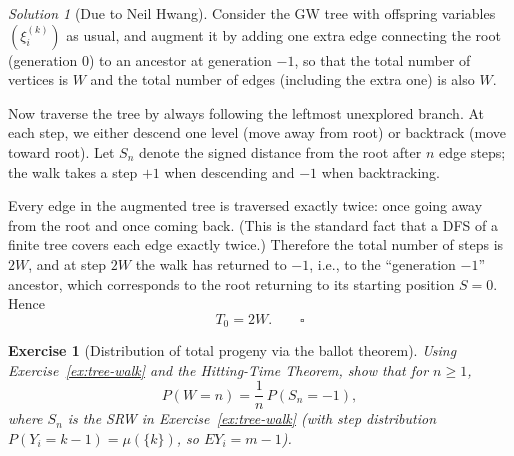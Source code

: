 \documentclass[12pt]{article}
\newtheorem{exercise}{Exercise}
\theoremstyle{remark}
\newtheorem*{solution}{Solution}
\begin{document}
\begin{solution}[Due to Neil Hwang]
Consider the GW tree with offspring variables $(\xi_i^{(k)})$ as usual, and augment it
by adding one extra edge connecting the root (generation $0$) to an ancestor at generation
$-1$, so that the total number of vertices is $W$ and the total number of edges
(including the extra one) is also $W$.

Now traverse the tree by always following the leftmost unexplored branch.  At each step,
we either descend one level (move away from root) or backtrack (move toward root).  Let
$S_n$ denote the signed distance from the root after $n$ edge steps; the walk takes a
step $+1$ when descending and $-1$ when backtracking.

Every edge in the augmented tree is traversed exactly twice: once going away from the root
and once coming back.  (This is the standard fact that a DFS of a finite tree covers each
edge exactly twice.)  Therefore the total number of steps is $2W$, and at step $2W$ the
walk has returned to $-1$, i.e., to the ``generation $-1$'' ancestor, which corresponds
to the root returning to its starting position $S = 0$.  Hence
\[
  T_0 = 2W. \qquad\square
\]
\end{solution}

\begin{exercise}[Distribution of total progeny via the ballot theorem]
\label{ex:total-progeny}
Using Exercise~\ref{ex:tree-walk} and the Hitting-Time Theorem, show that for $n \ge 1$,
\[
  P(W = n) = \frac{1}{n}\,P(S_n = -1),
\]
where $S_n$ is the SRW in Exercise~\ref{ex:tree-walk} (with step distribution
$P(Y_i = k-1) = \mu(\{k\})$, so $EY_i = m - 1$).
\end{exercise}
\end{document}

